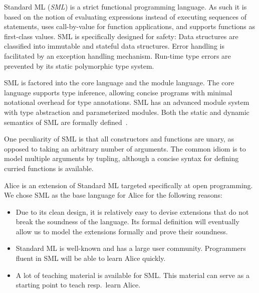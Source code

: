 \documentclass{entcs}
\begin{document}
Standard ML (\emph{SML}) is a strict functional programming language.
As such it is based on the notion of evaluating expressions instead
of executing sequences of statements, uses call-by-value for function
applications, and supports functions as first-class values.  SML is
specifically designed for safety:  Data structures are classified into
immutable and stateful data structures.  Error handling is facilitated
by an exception handling mechanism.  Run-time type errors are prevented
by its static polymorphic type system.

SML is factored into the core language and the module language.  The core
language supports type inference, allowing concise programs with minimal
notational overhead for type annotations.  SML has an advanced module system
with type abstraction and parameterized modules.  Both the static and
dynamic semantics of SML are formally defined~\cite{SMLDefinition}.

One peculiarity of SML is that all constructors and functions are unary,
as opposed to taking an arbitrary number of arguments.  The common idiom
is to model multiple arguments by tupling, although a concise syntax for
defining curried functions is available.

Alice \cite{Alice} is an extension of Standard ML targeted specifically
at open programming.  We chose SML as the base language for Alice for the
following reasons:
\begin{itemize}
\item Due to its clean design, it is relatively easy to devise extensions
  that do not break the soundness of the language.  Its formal definition
  will eventually allow us to model the extensions formally and prove
  their soundness.
\item Standard ML is well-known and has a large user community.  Programmers
  fluent in SML will be able to learn Alice quickly.
\item A lot of teaching material is available for SML.  This material can
  serve as a starting point to teach resp.\ learn Alice.
\end{itemize}
\end{document}
